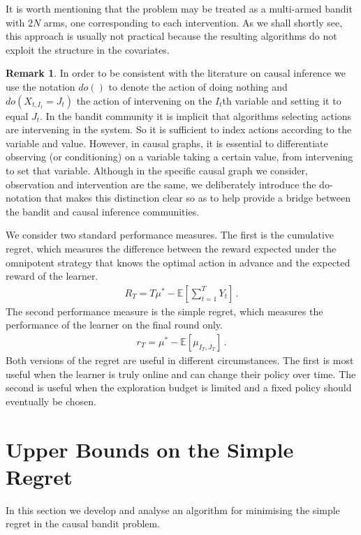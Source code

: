\documentclass{article}
\newcommand{\tinytodo}[2][]{\todo[size=\tiny]{#2}}
\newcommand{\todot}[2][]{\tinytodo[color=blue!20, #1]{T: #2}} %
\newcommand{\E}[1]{\mathbb E\left[#1\right]}
\newcommand{\eqn}[1]{\begin{align}#1\end{align}}
\theoremstyle{plain}
\theoremstyle{definition}
\newtheorem{remark}[theorem]{Remark}
\begin{document}
It is worth mentioning that the problem may be treated as a multi-armed bandit with $2N$ arms, one corresponding to each intervention.
As we shall shortly see, this approach is usually not practical because the resulting algorithms do not exploit the structure in
the covariates.


\begin{remark}
In order to be consistent with the literature on causal inference we use the notation $do()$ to denote the action of doing nothing and $do(X_{t,I_t} = J_t)$
the action of intervening on the $I_t$th variable and setting it to equal $J_t$. 
In the bandit community it is implicit that 
algorithms selecting actions are intervening in the system. So it is sufficient to index actions according to the variable and value. 
However, in causal graphs, it is essential to differentiate observing (or conditioning) on a variable taking a certain value, from 
intervening to set that variable. Although in the specific causal graph we consider, observation and intervention are the same, we 
deliberately introduce the do-notation \cite{Pearl2000} that makes this distinction clear so as to help provide a bridge between the 
bandit and causal inference communities.
\end{remark}


We consider two standard performance measures. The first is the cumulative regret, which measures the difference between the reward expected under
the omnipotent strategy that knows the optimal action in advance and the expected reward of the learner. 
\eqn{
\label{eq:regret}
R_T = T \mu^* - \E{\sum_{t=1}^T Y_t}\,.
}
The second performance measure is the simple regret, which measures the performance of the learner on the final round only.
\eqn{
\label{eq:regret-simple}
r_T = \mu^* - \E{\mu_{I_T,J_T}}\,.
}
Both versions of the regret are useful in different circumstances. The first is most useful when the learner is truly online and can change their policy over time.
The second is useful when the exploration budget is limited and a fixed policy should eventually be chosen. \todot{make this nicer}


\section{Upper Bounds on the Simple Regret}

In this section we develop and analyse an algorithm for minimising the simple regret in the
causal bandit problem.  
\end{document}
